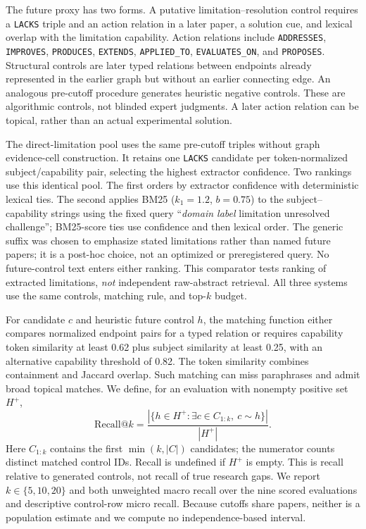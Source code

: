 \documentclass[conference,a4paper]{IEEEtran}
\begin{document}
The future proxy has two forms. A putative limitation--resolution control requires a \texttt{LACKS} triple and an action relation in a later paper, a solution cue, and lexical overlap with the limitation capability. Action relations include \texttt{ADDRESSES}, \texttt{IMPROVES}, \texttt{PRODUCES}, \texttt{EXTENDS}, \texttt{APPLIED\_TO}, \texttt{EVALUATES\_ON}, and \texttt{PROPOSES}. Structural controls are later typed relations between endpoints already represented in the earlier graph but without an earlier connecting edge. An analogous pre-cutoff procedure generates heuristic negative controls. These are algorithmic controls, not blinded expert judgments. A later action relation can be topical, rather than an actual experimental solution.

The direct-limitation pool uses the same pre-cutoff triples without graph evidence-cell construction. It retains one \texttt{LACKS} candidate per token-normalized subject/capability pair, selecting the highest extractor confidence. Two rankings use this identical pool. The first orders by extractor confidence with deterministic lexical ties. The second applies BM25 ($k_1=1.2$, $b=0.75$) to the subject--capability strings using the fixed query ``\emph{domain label} limitation unresolved challenge''; BM25-score ties use confidence and then lexical order. The generic suffix was chosen to emphasize stated limitations rather than named future papers; it is a post-hoc choice, not an optimized or preregistered query. No future-control text enters either ranking. This comparator tests ranking of extracted limitations, \emph{not} independent raw-abstract retrieval. All three systems use the same controls, matching rule, and top-$k$ budget.

For candidate $c$ and heuristic future control $h$, the matching function either compares normalized endpoint pairs for a typed relation or requires capability token similarity at least 0.62 plus subject similarity at least 0.25, with an alternative capability threshold of 0.82. The token similarity combines containment and Jaccard overlap. Such matching can miss paraphrases and admit broad topical matches. We define, for an evaluation with nonempty positive set $H^+$,
\begin{equation}
\mathrm{Recall@}k=\frac{|\{h\in H^+:\exists c\in C_{1:k},\ c\sim h\}|}{|H^+|}.
\label{eq:recall}
\end{equation}
Here $C_{1:k}$ contains the first $\min(k,|C|)$ candidates; the numerator counts distinct matched control IDs. Recall is undefined if $H^+$ is empty. This is recall relative to generated controls, not recall of true research gaps. We report $k\in\{5,10,20\}$ and both unweighted macro recall over the nine scored evaluations and descriptive control-row micro recall. Because cutoffs share papers, neither is a population estimate and we compute no independence-based interval.
\end{document}
